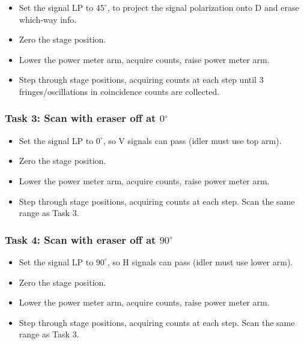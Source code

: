 \documentclass{article}
\begin{document}
\begin{itemize}
\item Set the signal LP to $45^\circ$, to project the signal polarization onto D and erase which-way info.
\item Zero the stage position.
\item Lower the power meter arm, acquire counts, raise power meter arm.  
\item Step through stage positions, acquiring counts at each step until 3 fringes/oscillations in coincidence counts are collected.
\end{itemize}

\subsubsection*{Task 3: Scan with eraser off at $0^\circ$}

\begin{itemize}
\item Set the signal LP to $0^\circ$, so V signals can pass (idler must use top arm).
\item Zero the stage position.
\item Lower the power meter arm, acquire counts, raise power meter arm.  
\item Step through stage positions, acquiring counts at each step. Scan the same range as Task 3.
\end{itemize}

\subsubsection*{Task 4: Scan with eraser off at $90^\circ$}

\begin{itemize}
\item Set the signal LP to $90^\circ$, so H signals can pass (idler must use lower arm).
\item Zero the stage position.
\item Lower the power meter arm, acquire counts, raise power meter arm.  
\item Step through stage positions, acquiring counts at each step. Scan the same range as Task 3.
\end{itemize}
\end{document}
